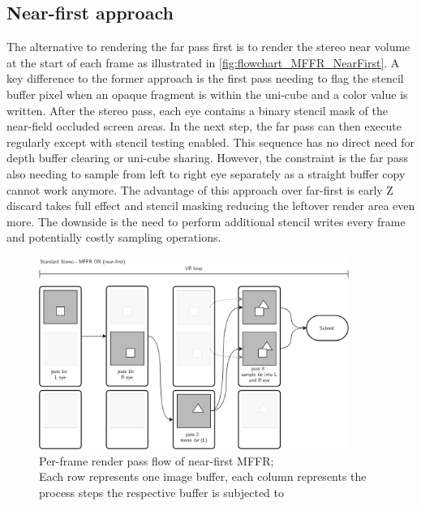 \subsection{Near-first approach}
The alternative to rendering the far pass first is to render the stereo near volume at the start of each frame as illustrated in \autoref{fig:flowchart_MFFR_NearFirst}. A key difference to the former approach is the first pass needing to flag the stencil buffer pixel when an opaque fragment is within the uni-cube and a color value is written. After the stereo pass, each eye contains a binary stencil mask of the near-field occluded screen areas. In the next step, the far pass can then execute regularly except with stencil testing enabled. This sequence has no direct need for depth buffer clearing or uni-cube sharing. However, the constraint is the far pass also needing to sample from left to right eye separately as a straight buffer copy cannot work anymore. 
The advantage of this approach over far-first is early Z discard takes full effect and stencil masking reducing the leftover render area even more. The downside is the need to perform additional stencil writes every frame and potentially costly sampling operations.

\begin{figure}[htb]
  \centering
  \includegraphics[width=0.9\textwidth]{pictures/MFFR_nearfirst}
  \caption{Per-frame render pass flow of near-first \gls{MFFR}; \\
  Each row represents one image buffer, each column represents the process steps the respective buffer is subjected to} \label{fig:flowchart_MFFR_NearFirst}
\end{figure}
 
